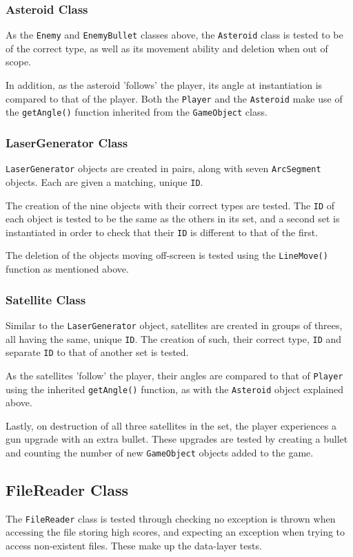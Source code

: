 \documentclass[10pt,twocolumn]{witseiepaper}
\begin{document}
\subsubsection{Asteroid Class}
As the \texttt{Enemy} and \texttt{EnemyBullet} classes above, the \texttt{Asteroid} class is tested to be of the correct type, as well as its movement ability and deletion when out of scope. 

In addition, as the asteroid 'follows' the player, its angle at instantiation is compared to that of the player. Both the \texttt{Player} and the \texttt{Asteroid} make use of the \texttt{getAngle()} function inherited from the \texttt{GameObject} class.
\subsubsection{LaserGenerator Class}
\texttt{LaserGenerator} objects are created in pairs, along with seven \texttt{ArcSegment} objects. Each are given a matching, unique \texttt{ID}. 

The creation of the nine objects with their correct types are tested. The \texttt{ID} of each object is tested to be the same as the others in its set, and a second set is instantiated in order to check that their \texttt{ID} is different to that of the first.

The deletion of the objects moving off-screen is tested using the \texttt{LineMove()} function as mentioned above. 
\subsubsection{Satellite Class}
Similar to the \texttt{LaserGenerator} object, satellites are created in groups of threes, all having the same, unique \texttt{ID}. The creation of such, their correct type, \texttt{ID} and separate \texttt{ID} to that of another set is tested. 

As the satellites 'follow' the player, their angles are compared to that of \texttt{Player} using the inherited \texttt{getAngle()} function, as with the \texttt{Asteroid} object explained above.

Lastly, on destruction of all three satellites in the set, the player experiences a gun upgrade with an extra bullet. These upgrades are tested by creating a bullet and counting the number of new \texttt{GameObject} objects added to the game.

\subsection{FileReader Class}
The \texttt{FileReader} class is tested through checking no exception is thrown when accessing the file storing high scores, and expecting an exception when trying to access non-existent files. These make up the data-layer tests.
\end{document}
